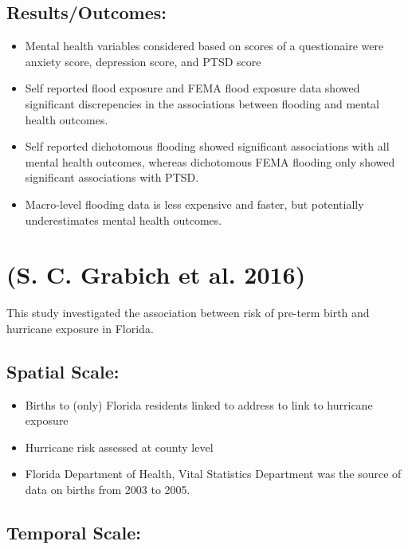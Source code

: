 \documentclass[
]{article}
\providecommand{\tightlist}{%
  \setlength{\itemsep}{0pt}\setlength{\parskip}{0pt}}
\begin{document}
\hypertarget{resultsoutcomes-2}{%
\subsection{Results/Outcomes:}\label{resultsoutcomes-2}}

\begin{itemize}
\tightlist
\item
  Mental health variables considered based on scores of a questionaire
  were anxiety score, depression score, and PTSD score
\item
  Self reported flood exposure and FEMA flood exposure data showed
  significant discrepencies in the associations between flooding and
  mental health outcomes.
\item
  Self reported dichotomous flooding showed significant associations
  with all mental health outcomes, whereas dichotomous FEMA flooding
  only showed significant associations with PTSD.
\item
  Macro-level flooding data is less expensive and faster, but
  potentially underestimates mental health outcomes.
\end{itemize}

\hypertarget{grabich2016hurricane}{%
\section{(S. C. Grabich et al. 2016)}\label{grabich2016hurricane}}

This study investigated the association between risk of pre-term birth
and hurricane exposure in Florida.

\hypertarget{spatial-scale-4}{%
\subsection{Spatial Scale:}\label{spatial-scale-4}}

\begin{itemize}
\tightlist
\item
  Births to (only) Florida residents linked to address to link to
  hurricane exposure
\item
  Hurricane risk assessed at county level
\item
  Florida Department of Health, Vital Statistics Department was the
  source of data on births from 2003 to 2005.
\end{itemize}

\hypertarget{temporal-scale-4}{%
\subsection{Temporal Scale:}\label{temporal-scale-4}}
\end{document}

